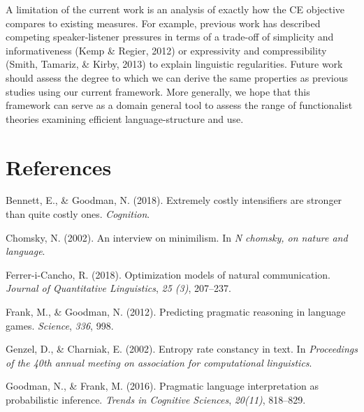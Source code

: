 \documentclass[10pt, letterpaper]{article}
\begin{document}
A limitation of the current work is an analysis of exactly how the CE
objective compares to existing measures. For example, previous work has
described competing speaker-listener pressures in terms of a trade-off
of simplicity and informativeness (Kemp \& Regier, 2012) or expressivity
and compressibility (Smith, Tamariz, \& Kirby, 2013) to explain
linguistic regularities. Future work should assess the degree to which
we can derive the same properties as previous studies using our current
framework. More generally, we hope that this framework can serve as a
domain general tool to assess the range of functionalist theories
examining efficient language-structure and use.\par

\vspace{1em}

\vspace{1em} \noindent

\section{References}\label{references}

\setlength{\parindent}{-0.1in} \setlength{\leftskip}{0.125in} \noindent

\hypertarget{refs}{}
\hypertarget{ref-BennettGoodman2015a}{}
Bennett, E., \& Goodman, N. (2018). Extremely costly intensifiers are
stronger than quite costly ones. \emph{Cognition}.

\hypertarget{ref-Chomsky2002a}{}
Chomsky, N. (2002). An interview on minimilism. In \emph{N chomsky, on
nature and language}.

\hypertarget{ref-FerreriCancho2018a}{}
Ferrer-i-Cancho, R. (2018). Optimization models of natural
communication. \emph{Journal of Quantitative Linguistics}, \emph{25
(3)}, 207--237.

\hypertarget{ref-FrankGoodman2012a}{}
Frank, M., \& Goodman, N. (2012). Predicting pragmatic reasoning in
language games. \emph{Science}, \emph{336}, 998.

\hypertarget{ref-GenzelCharniak2002a}{}
Genzel, D., \& Charniak, E. (2002). Entropy rate constancy in text. In
\emph{Proceedings of the 40th annual meeting on association for
computational linguistics}.

\hypertarget{ref-GoodmanFrank2016a}{}
Goodman, N., \& Frank, M. (2016). Pragmatic language interpretation as
probabilistic inference. \emph{Trends in Cognitive Sciences},
\emph{20(11)}, 818--829.
\end{document}
